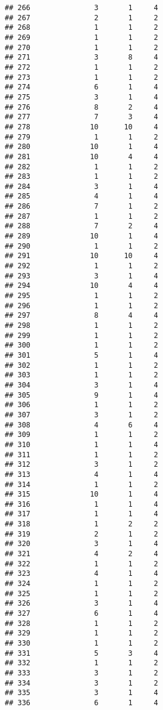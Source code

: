 \documentclass[
]{article}
\begin{document}
\begin{verbatim}
## 266               3       1     4
## 267               2       1     2
## 268               1       1     2
## 269               1       1     2
## 270               1       1     2
## 271               3       8     4
## 272               1       1     2
## 273               1       1     2
## 274               6       1     4
## 275               3       1     4
## 276               8       2     4
## 277               7       3     4
## 278              10      10     4
## 279               1       1     2
## 280              10       1     4
## 281              10       4     4
## 282               1       1     2
## 283               1       1     2
## 284               3       1     4
## 285               4       1     4
## 286               7       1     2
## 287               1       1     2
## 288               7       2     4
## 289              10       1     4
## 290               1       1     2
## 291              10      10     4
## 292               1       1     2
## 293               3       1     4
## 294              10       4     4
## 295               1       1     2
## 296               1       1     2
## 297               8       4     4
## 298               1       1     2
## 299               1       1     2
## 300               1       1     2
## 301               5       1     4
## 302               1       1     2
## 303               1       1     2
## 304               3       1     4
## 305               9       1     4
## 306               1       1     2
## 307               3       1     2
## 308               4       6     4
## 309               1       1     2
## 310               1       1     4
## 311               1       1     2
## 312               3       1     2
## 313               4       1     4
## 314               1       1     2
## 315              10       1     4
## 316               1       1     4
## 317               1       1     4
## 318               1       2     2
## 319               2       1     2
## 320               3       1     4
## 321               4       2     4
## 322               1       1     2
## 323               4       1     4
## 324               1       1     2
## 325               1       1     2
## 326               3       1     4
## 327               6       1     4
## 328               1       1     2
## 329               1       1     2
## 330               1       1     2
## 331               5       3     4
## 332               1       1     2
## 333               3       1     2
## 334               3       1     2
## 335               3       1     4
## 336               6       1     4

\end{verbatim}
\end{document}
